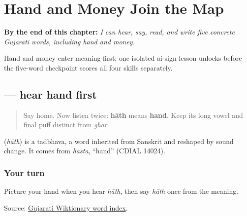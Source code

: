 
\chapter{Hand and Money Join the Map}
\label{ch:gu-hand-money-map}

\begin{chapteropening}
\textbf{By the end of this chapter:} \emph{I can hear, say, read, and write five concrete Gujarati words, including hand and money.}

Hand and money enter meaning-first; one isolated ai-sign lesson unlocks  before the five-word checkpoint scores all four skills separately.
\end{chapteropening}

\section[\texorpdfstring{\gu{હાથ} (hāth)}{હાથ (hāth)}]{ — hear hand first}

\label{lesson:GU-C21-hear-haath}



\begin{quote}
Say home. Now listen twice: \textbf{hāth} means \textbf{hand}. Keep its long vowel and final puff distinct from \emph{ghar}.
\end{quote}

\begin{cousinweb}
\textbf{} (\emph{hāth}) is a tadbhava, a word inherited from Sanskrit and reshaped by sound change. It comes from \emph{hasta}, \textquotedblleft{}hand\textquotedblright{} (CDIAL 14024).
\end{cousinweb}

\subsection*{Your turn}
Picture your hand when you hear \emph{hāth}, then say \emph{hāth} once from the meaning.

\begin{tcolorbox}[breakable,colback=teal!4,colframe=teal!35!black,title={Before you move on}]
Source: \href{https://gu.wiktionary.org/wiki/\%E0\%AA\%B5\%E0\%AA\%BF\%E0\%AA\%95\%E0\%AA\%BF\%E0\%AA\%95\%E0\%AB\%8B\%E0\%AA\%B6:\%E0\%AA\%B6\%E0\%AA\%AC\%E0\%AB\%8D\%E0\%AA\%A6\_\%E0\%AA\%85\%E0\%AA\%A8\%E0\%AB\%81\%E0\%AA\%95\%E0\%AB\%8D\%E0\%AA\%B0\%E0\%AA\%AE\%E0\%AA\%A3\%E0\%AA\%BF\%E0\%AA\%95\%E0\%AA\%BE}{Gujarati Wiktionary word index}.
\end{tcolorbox}
